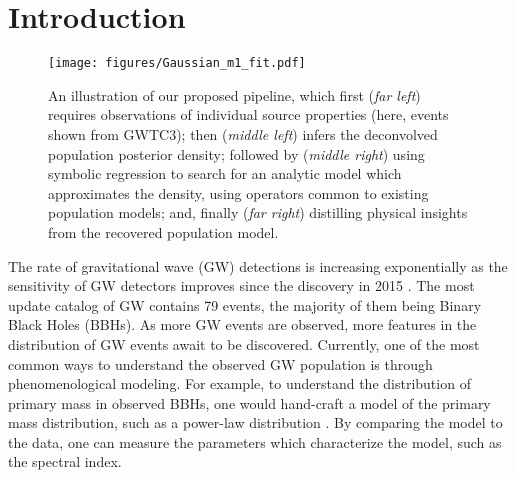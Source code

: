 \documentclass[nohyperref]{article}
\theoremstyle{plain}
\theoremstyle{definition}
\theoremstyle{remark}
\begin{document}
\section{Introduction}
\begin{figure*}[hbt!]
\texttt{[image: figures/Gaussian\_m1\_fit.pdf]}
\caption{An illustration of our proposed pipeline, which first
(\textit{far left})
requires observations of individual source properties (here, events shown from GWTC3);
then
(\textit{middle left}) 
infers the deconvolved population posterior density;
followed by (\textit{middle right})
using symbolic regression to search for an analytic model which approximates the density, using
operators common to existing population models; and, finally
(\textit{far right}) distilling physical insights
from the recovered population model.
}
\label{fig:Gaussian_m1_fit}
\end{figure*}
The rate of gravitational wave (GW) detections is increasing exponentially as the sensitivity of GW detectors improves \cite{LIGOScientific:2021djp} since the discovery in 2015 \cite{Abbott:2016blz}.
The most update catalog of GW contains 79 events, the majority of them being Binary Black Holes (BBHs).
As more GW events are observed, more features in the distribution of GW events await to be discovered.
Currently, one of the most common ways to understand the observed GW population is through phenomenological modeling.
For example, to understand the distribution of primary mass in observed BBHs, one would hand-craft a model of the primary mass distribution, such as a power-law distribution \cite{LIGOScientific:2021psn}.
By comparing the model to the data, one can measure the parameters which characterize the model, such as the spectral index.
\end{document}
